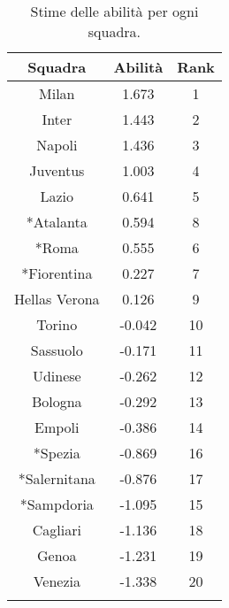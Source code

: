 \begin{table}[!htb]%
	
	\renewcommand{\arraystretch}{1.7}
	\centering
	\begin{tabular}{c c c }
		\hline	
		
		\textbf{Squadra} & \textbf{Abilità} & \textbf{Rank}   \\	
		\hline			
		Milan & 1.673 & 1\\
		Inter & 1.443 &  2\\
		Napoli & 1.436 & 3 \\		
		Juventus & 1.003 & 4\\
		Lazio & 0.641 & 5\\
		*Atalanta & 0.594 & 8 \\
		*Roma & 0.555 &  6\\
		*Fiorentina & 0.227 &  7\\
		Hellas Verona & 0.126 & 9 \\
		Torino & -0.042 & 10 \\	
		Sassuolo & -0.171 & 11\\
		Udinese & -0.262 & 12\\
		Bologna & -0.292 &  13\\
		Empoli & -0.386 & 14\\
		*Spezia & -0.869 &  16\\
		*Salernitana & -0.876 & 17\\
		*Sampdoria & -1.095 &  15\\
		Cagliari & -1.136 &  18\\
		Genoa & -1.231 & 19 \\
		Venezia & -1.338 &  20\\
		
		\hline
		& &  \\
		
	\end{tabular} \hbox{}
	\caption{Stime delle abilità per ogni squadra.} \label{tab:BTCL}  
\end{table}

